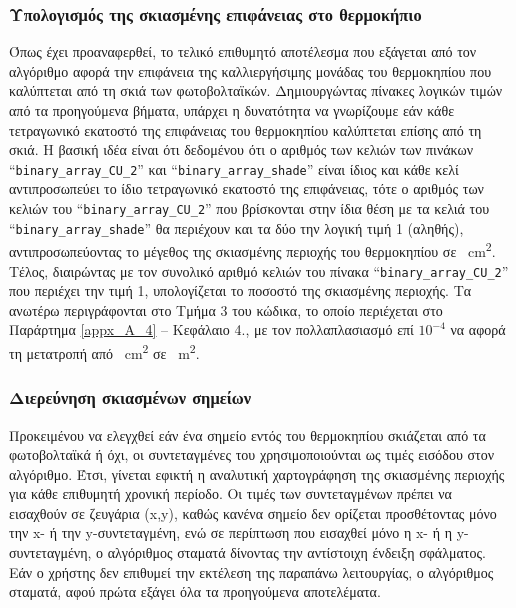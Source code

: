 \documentclass[12pt, a4paper]{report} %
\newcommand{\english}{\foreignlanguage{english}}
\begin{document}
\subsubsection{Υπολογισμός της σκιασμένης επιφάνειας στο θερμοκήπιο}\label{subsub_shaded_surf_calc}

Όπως έχει προαναφερθεί, το τελικό επιθυμητό αποτέλεσμα που εξάγεται από τον αλγόριθμο αφορά την επιφάνεια της καλλιεργήσιμης 
μονάδας του θερμοκηπίου που καλύπτεται από τη σκιά των φωτοβολταϊκών. Δημιουργώντας πίνακες λογικών τιμών από τα προηγούμενα 
βήματα, υπάρχει η δυνατότητα να γνωρίζουμε εάν κάθε τετραγωνικό εκατοστό της επιφάνειας του θερμοκηπίου καλύπτεται επίσης από τη 
σκιά. Η βασική ιδέα είναι ότι δεδομένου ότι ο αριθμός των κελιών των πινάκων “\texttt{\english{binary\_array\_CU\_2}}” και 
“\texttt{\english{binary\_array\_shade}}” είναι ίδιος και κάθε κελί αντιπροσωπεύει το ίδιο τετραγωνικό εκατοστό της επιφάνειας, 
τότε ο αριθμός των κελιών του “\texttt{\english{binary\_array\_CU\_2}}” που βρίσκονται στην ίδια θέση με τα κελιά του 
“\texttt{\english{binary\_array\_shade}}” θα περιέχουν και τα δύο την λογική τιμή 1 (αληθής),  αντιπροσωπεύοντας το μέγεθος της 
σκιασμένης περιοχής του θερμοκηπίου σε \SI{}{\centi\meter\squared}. Τέλος, διαιρώντας με τον συνολικό αριθμό κελιών του πίνακα 
“\texttt{\english{binary\_array\_CU\_2}}” που περιέχει την τιμή 1, υπολογίζεται το ποσοστό της σκιασμένης περιοχής. Τα ανωτέρω 
περιγράφονται στο Τμήμα 3 του κώδικα, το οποίο περιέχεται στο Παράρτημα \ref{appx_A_4} – Κεφάλαιο 4., με τον πολλαπλασιασμό επί 
$10^{-4}$ να αφορά τη μετατροπή από \SI{}{\centi\meter\squared} σε \SI{}{\meter\squared}.

\subsubsection{Διερεύνηση σκιασμένων σημείων}\label{subsub_shaded_point_inv}

Προκειμένου να ελεγχθεί εάν ένα σημείο εντός του θερμοκηπίου σκιάζεται από τα φωτοβολταϊκά ή όχι, οι συντεταγμένες του 
χρησιμοποιούνται ως τιμές εισόδου στον αλγόριθμο. Έτσι, γίνεται εφικτή η αναλυτική χαρτογράφηση της σκιασμένης περιοχής 
για κάθε επιθυμητή χρονική περίοδο. Οι τιμές των συντεταγμένων πρέπει να εισαχθούν σε ζευγάρια (\english{x,y}), καθώς κανένα 
σημείο δεν ορίζεται προσθέτοντας μόνο την \english{x}- ή την \english{y}-συντεταγμένη, ενώ σε περίπτωση που εισαχθεί μόνο η 
\english{x}- ή η \english{y}-συντεταγμένη, ο αλγόριθμος σταματά δίνοντας την αντίστοιχη ένδειξη σφάλματος. Εάν ο χρήστης δεν 
επιθυμεί την εκτέλεση της παραπάνω λειτουργίας, ο αλγόριθμος σταματά, αφού πρώτα εξάγει όλα τα προηγούμενα αποτελέματα.
\end{document}
